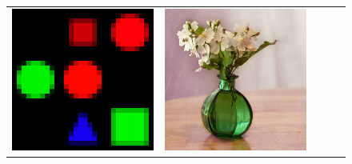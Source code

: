 \begin{figure}
\begin{tabular}{>{\raggedright}*{5}{p{.17\textwidth}}}
    \includegraphics[width=\linewidth]{fig/shapes2_big} &
    \includegraphics[width=\linewidth]{fig/thumb/vqa1.jpg} &

\end{tabular}
\end{figure}
